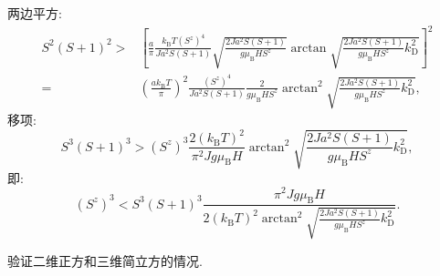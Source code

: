 两边平方:
\begin{align}
S^{2}(S+1)^{2}>&\left[\frac{a}{\pi} \frac{k_{\mathrm{B}} T\left(S^{z}\right)^{4}}{J a^{2} S(S+1)} \sqrt{\frac{2 J a^{2} S(S+1)}{g \mu_{\mathrm{B}} H S^{z}}} \arctan \sqrt{\frac{2 J a^{2} S(S+1)}{g \mu_{\mathrm{B}} H S^{z}} k_{\mathrm{D}}^{2}}\right]^{2}\nonumber\\
=&\left(\frac{a k_{\mathrm{B}} T}{\pi}\right)^{2} \frac{\left(S^{z}\right)^{4}}{J a^{2} S(S+1)} \frac{2}{g \mu_{\mathrm{B}} H S^{z}} \arctan ^{2}\sqrt{\frac{2 J a^{2} S(S+1)}{g \mu_{\mathrm{B}} H S^{z} }k_{\mathrm{D}}^{2}},
\end{align}
移项:
\begin{equation}
 S^{3}(S+1)^{3}>\left(S^{z}\right)^{3} \frac{2\left(k_{\mathrm{B}} T\right)^{2}}{\pi^{2} J g \mu_{\mathrm{B}} H} \arctan ^{2}\sqrt{\frac{2 J a^{2} S(S+1)}{g \mu_{\mathrm{B}} H S^{z}} k_{\mathrm{D}}^{2}},
\end{equation}
即:
\begin{equation}
\left(S^{z}\right)^{3}<S^{3}(S+1)^{3} \frac{\pi^{2} J g \mu_{\mathrm{B}} H}{2\left(k_{\mathrm{B}} T\right)^{2} \arctan ^{2}\sqrt{\frac{2 J a^{2} S(S+1)}{g \mu_{\mathrm{B}} H S^{z}} k_{\mathrm{D}}^{2}}}.
\end{equation}

\begin{question}{}{}
验证二维正方和三维简立方的情况.
\end{question}

























